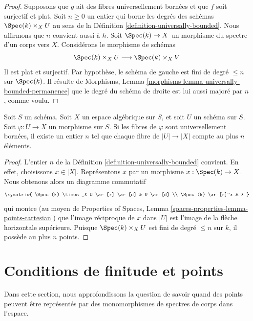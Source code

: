 \begin{proof}
Supposons que $g$ ait des fibres universellement bornées et que $f$ soit
surjectif et plat. Soit $n \geq 0$ un entier qui borne les degrés des schémas
$\Spec(k) \times_X U$ au sens de la
Définition \ref{definition-universally-bounded}.
Nous affirmons que $n$ convient aussi à $h$.
Soit $\Spec(k) \to X$ un morphisme du spectre d'un corps vers $X$.
Considérons le morphisme de schémas
$$
\Spec(k) \times_X U \longrightarrow \Spec(k) \times_X V
$$
Il est plat et surjectif. Par hypothèse, le schéma de gauche est fini de degré
$\leq n$ sur $\Spec(k)$. Il résulte de
Morphisms, Lemma \ref{morphisms-lemma-universally-bounded-permanence}
que le degré du schéma de droite est lui aussi majoré par $n$, comme voulu.
\end{proof}

\begin{lemma}
\label{lemma-universally-bounded-finite-fibres}
Soit $S$ un schéma.
Soit $X$ un espace algébrique sur $S$, et soit $U$ un schéma sur $S$.
Soit $\varphi : U \to X$ un morphisme sur $S$.
Si les fibres de $\varphi$ sont universellement bornées, il existe un entier
$n$ tel que chaque fibre de $|U| \to |X|$ compte au plus $n$ éléments.
\end{lemma}

\begin{proof}
L'entier $n$ de la Définition \ref{definition-universally-bounded} convient.
En effet, choisissons $x \in |X|$. Représentons $x$ par un morphisme
$x : \Spec(k) \to X$. Nous obtenons alors un diagramme commutatif
$$
\xymatrix{
\Spec(k) \times_X U \ar[r] \ar[d] & U \ar[d] \\
\Spec(k) \ar[r]^x & X
}
$$
qui montre (au moyen de
Properties of Spaces,
Lemma \ref{spaces-properties-lemma-points-cartesian})
que l'image réciproque de $x$ dans $|U|$ est l'image de la flèche horizontale
supérieure. Puisque $\Spec(k) \times_X U$ est fini de degré $\leq n$ sur $k$,
il possède au plus $n$ points.
\end{proof}








\section{Conditions de finitude et points}
\label{section-points-monomorphisms}

\noindent
Dans cette section, nous approfondissons la question de savoir quand des
points peuvent être représentés par des monomorphismes de spectres de corps
dans l'espace.

